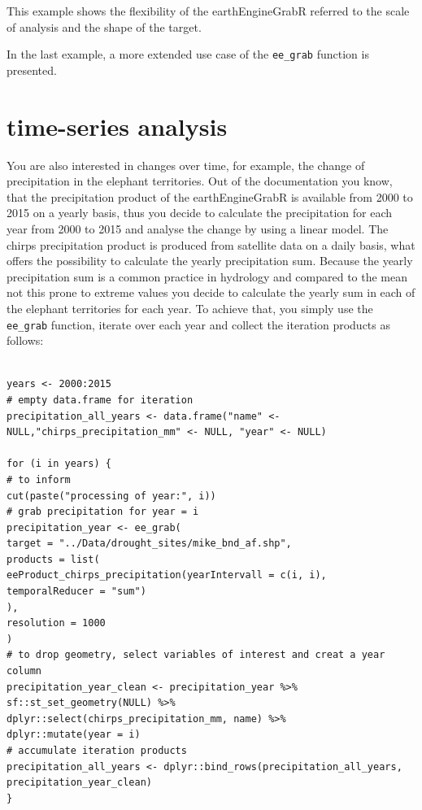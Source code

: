 This example shows the flexibility of the earthEngineGrabR referred to the scale of analysis and the shape of the target.

In the last example, a more extended use case of the \texttt{ee\_grab} function is presented.


\section{time-series analysis}

You are also interested in changes over time, for example, the change of precipitation in the elephant territories. Out of the documentation you know, that the precipitation product of the earthEngineGrabR is available from 2000 to 2015 on a yearly basis, thus you decide to calculate the precipitation for each year from 2000 to 2015 and analyse the change by using a linear model. The chirps precipitation product is produced from satellite data on a daily basis, what offers the possibility to calculate the yearly precipitation sum. Because the yearly precipitation sum is a common practice in hydrology and compared to the mean not this prone to extreme values you decide to calculate the yearly sum in each of the elephant territories for each year. To achieve that, you simply use the \texttt{ee\_grab} function, iterate over each year and collect the iteration products as follows:

\begin{lstlisting}

years <- 2000:2015
# empty data.frame for iteration
precipitation_all_years <- data.frame("name" <- NULL,"chirps_precipitation_mm" <- NULL, "year" <- NULL)

for (i in years) {
# to inform
cut(paste("processing of year:", i))
# grab precipitation for year = i
precipitation_year <- ee_grab(
target = "../Data/drought_sites/mike_bnd_af.shp",
products = list(
eeProduct_chirps_precipitation(yearIntervall = c(i, i), temporalReducer = "sum")
),
resolution = 1000
)
# to drop geometry, select variables of interest and creat a year column
precipitation_year_clean <- precipitation_year %>% 
sf::st_set_geometry(NULL) %>% 
dplyr::select(chirps_precipitation_mm, name) %>% 
dplyr::mutate(year = i)
# accumulate iteration products
precipitation_all_years <- dplyr::bind_rows(precipitation_all_years, precipitation_year_clean)
}
\end{lstlisting}




